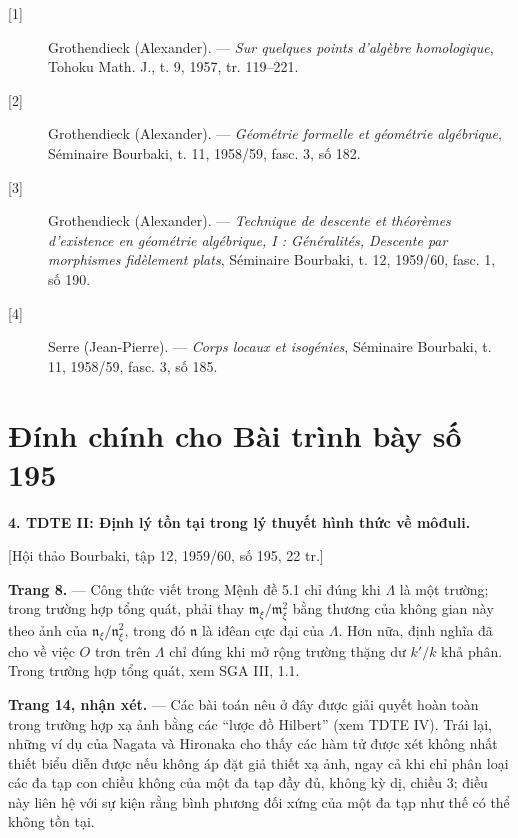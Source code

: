 \documentclass[11pt,twoside,openany]{book}
\numberwithin{equation}{section}
\newcommand{\src}[1]{%
  \phantomsection\hypertarget{src:\fgasourceid:#1}{}%
  \marginpar{\raggedleft\footnotesize\sffamily #1}%
}
\newcommand{\fgasourceid}{unset}
\newcommand{\sid}[1]{\gdef\fgasourceid{#1}\phantomsection\hypertarget{fga:#1}{}}
\begin{document}
\begin{description}
  \item[{[1]}] Grothendieck (Alexander). --- \emph{Sur quelques points
    d'algèbre homologique}, Tohoku Math. J., t. 9, 1957, tr. 119--221.
  \item[{[2]}] Grothendieck (Alexander). --- \emph{Géométrie formelle et
    géométrie algébrique}, Séminaire Bourbaki, t. 11, 1958/59, fasc. 3,
    số 182.
  \item[{[3]}] Grothendieck (Alexander). --- \emph{Technique de descente et
    théorèmes d'existence en géométrie algébrique, I : Généralités, Descente
    par morphismes fidèlement plats}, Séminaire Bourbaki, t. 12, 1959/60,
    fasc. 1, số 190.
  \item[{[4]}] Serre (Jean-Pierre). --- \emph{Corps locaux et isogénies},
    Séminaire Bourbaki, t. 11, 1958/59, fasc. 3, số 185.
\end{description}

\par

\clearpage
\chapter*{Đính chính cho Bài trình bày số 195}
\setcounter{footnote}{0}
\sid{e195}
\src{300}

\noindent\textbf{4. TDTE II: Định lý tồn tại trong lý thuyết hình thức về
môđuli.}

\begin{center}
[Hội thảo Bourbaki, tập 12, 1959/60, số 195, 22 tr.]
\end{center}

\noindent\textbf{Trang 8.} --- Công thức viết trong Mệnh đề 5.1 chỉ đúng khi
$\Lambda$ là một trường; trong trường hợp tổng quát, phải thay
$\mathfrak m_\xi/\mathfrak m_\xi^2$ bằng thương của không gian này theo ảnh
của $\mathfrak n_\xi/\mathfrak n_\xi^2$, trong đó $\mathfrak n$ là iđêan cực
đại của $\Lambda$. Hơn nữa, định nghĩa đã cho về việc $O$ trơn trên
$\Lambda$ chỉ đúng khi mở rộng trường thặng dư $k'/k$ khả phân. Trong trường
hợp tổng quát, xem SGA III, 1.1.

\noindent\textbf{Trang 14, nhận xét.} --- Các bài toán nêu ở đây được giải
quyết hoàn toàn trong trường hợp xạ ảnh bằng các ``lược đồ Hilbert'' (xem
TDTE IV). Trái lại, những ví dụ của Nagata và Hironaka cho thấy các hàm tử
được xét không nhất thiết biểu diễn được nếu không áp đặt giả thiết xạ ảnh,
ngay cả khi chỉ phân loại các đa tạp con chiều không của một đa tạp đầy đủ,
không kỳ dị, chiều 3; điều này liên hệ với sự kiện rằng bình phương đối xứng
của một đa tạp như thế có thể không tồn tại.
\end{document}
